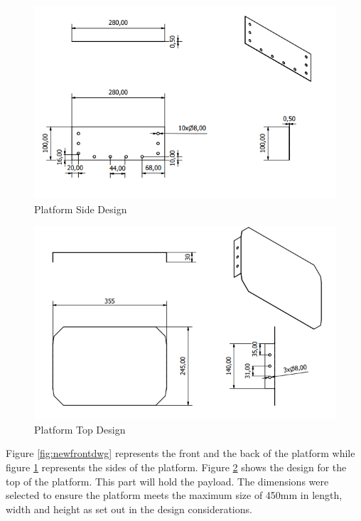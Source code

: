 \begin{figure}[H]
    \centering
    \includegraphics[scale = 0.9]{Figures/NewSideDWG.png}
    \caption{Platform Side Design}
    \label{fig:newsidedwg}
\end{figure}

\begin{figure}[H]
    \centering
    \includegraphics[scale = 0.9]{Figures/NewTopDWG.png}
    \caption{Platform Top Design}
    \label{fig:newtopdwg}
\end{figure}

Figure \ref{fig:newfrontdwg} represents the front and the back of the platform while figure \ref{fig:newsidedwg} represents the sides of the platform. Figure \ref{fig:newtopdwg} shows the design for the top of the platform. This part will hold the payload. The dimensions were selected to ensure the platform meets the maximum size of 450mm in length, width and height as set out in the design considerations. 

